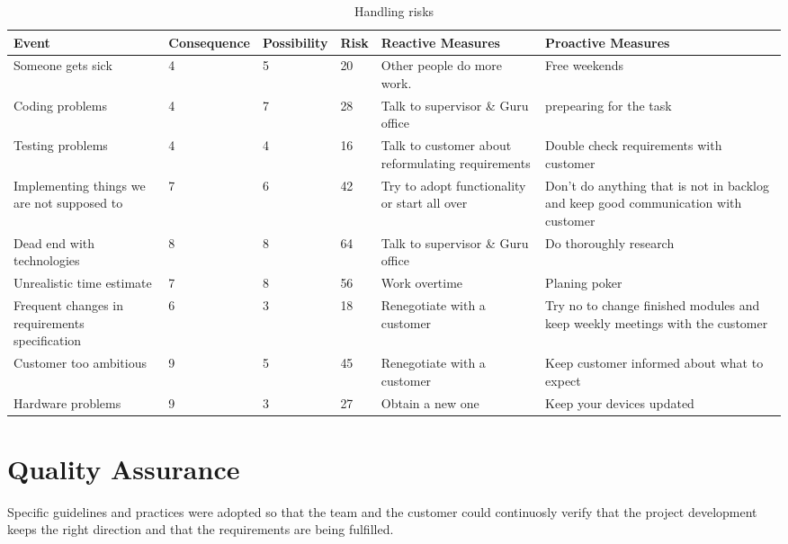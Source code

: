 \documentclass{article}
\newcommand{\ra}[1]{\renewcommand{\arraystretch}{#1}}
\begin{document}
\begin{table}\centering \ra{1.3}
    \caption{Handling risks}
    \label{tab:risks}
    \vspace{2mm} %
    \begin{tabularx}{\textwidth}{XlllXX}
    \toprule
        Event & Consequence & Possibility & Risk  & Reactive Measures & Proactive Measures \\
    \midrule
Someone gets sick & 4     & 5     & 20    & Other people do more work.  & Free weekends \\
Coding problems & 4     & 7     & 28    & Talk to supervisor \& Guru office & prepearing for the task \\
Testing problems & 4     & 4     & 16    & Talk to customer about reformulating requirements & Double check requirements with customer \\
Implementing things we are not supposed to & 7     & 6     & 42    & Try to adopt functionality or start all over & Don't do anything that is not in backlog and keep good communication with customer \\
Dead end with technologies & 8     & 8     & 64    & Talk to supervisor \& Guru office & Do thoroughly research \\
Unrealistic time estimate & 7     & 8     & 56    & Work overtime  & Planing poker \\
Frequent changes in requirements specification & 6     & 3     & 18    & Renegotiate with a customer & Try no to change finished modules and keep weekly meetings with the customer \\
Customer too ambitious & 9     & 5     & 45    & Renegotiate with a customer & Keep customer informed about what  to expect \\
Hardware problems & 9     & 3     & 27    & Obtain a new one & Keep your devices updated \\
    \bottomrule
    \end{tabularx}%
\end{table}
\section{Quality Assurance}
Specific guidelines and practices were adopted
so that the team and the customer could continuosly verify that the project development keeps the right direction and that the requirements are being fulfilled.
\end{document}
